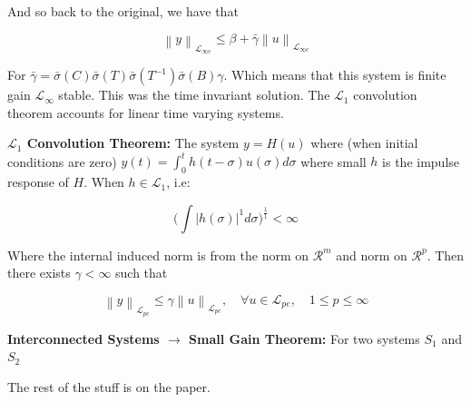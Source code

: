 \documentclass[11pt]{article}
\newcommand{\norm}[1]{\left\lVert#1\right\rVert}
\begin{document}
And so back to the original, we have that 

\begin{equation}
	\norm{y}_{\mathcal{L}_{\infty e}} \leq \beta + \bar{\gamma} \norm{u}_{\mathcal{L}_{\infty e}}
\end{equation}

For $\bar{\gamma} = \bar{\sigma}(C)\bar{\sigma}(T)\bar{\sigma}(T^{-1})\bar{\sigma}(B) \gamma$. Which means that this system is finite gain $\mathcal{L}_{\infty}$ stable. This was the time invariant solution. The $\mathcal{L}_1$ convolution theorem accounts for linear time varying systems. 

\textbf{$\mathcal{L}_1$ Convolution Theorem:} The system $y = H(u)$ where (when initial conditions are zero) $y(t) = \int_0^t h(t-\sigma)u(\sigma)d\sigma$ where small $h$ is the impulse response of $H$. When $h \in \mathcal{L}_1$, i.e: 

\begin{equation}
 \bigg ( \int \rvert h(\sigma) \rvert^1 d\sigma \bigg)^{\frac{1}{1}} < \infty	
\end{equation}

Where the internal induced norm is from the norm on $\mathcal{R}^m$ and norm on $\mathcal{R}^p$. Then there exists $\gamma < \infty$ such that 

\begin{equation}
 \norm{y}_{\mathcal{L}_{pe}} \leq \gamma \norm{u}_{\mathcal{L}_{pe}}, \quad \forall u \in  	\mathcal{L}_{pe}, \quad 1\leq p \leq \infty
\end{equation}



\textbf{Interconnected Systems $\rightarrow$ Small Gain Theorem:} For two systems $S_1$ and $S_2$

The rest of the stuff is on the paper.



































\clearpage
% 
\end{document}
